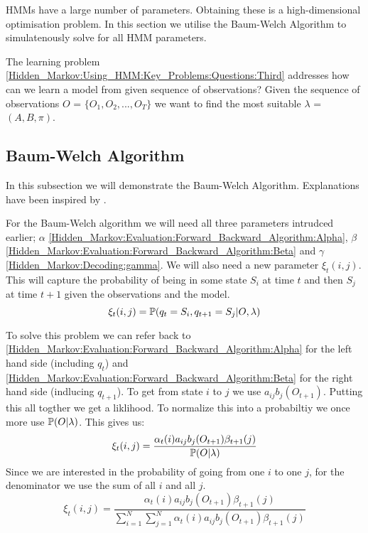 HMMs have a large number of parameters. Obtaining these is a high-dimensional optimisation problem. In this section we utilise the Baum-Welch Algorithm to simulatenously solve for all HMM parameters.

The learning problem \ref{Hidden_Markov:Using_HMM:Key_Problems:Questions:Third} addresses how can we learn a model from given sequence of observations?  Given the sequence of observations $O$ = $\{O_1,O_2,...,O_T\}$ we want to find the most suitable $\lambda$ = $(A,B,\pi)$.


    \subsection{Baum-Welch Algorithm}
    \label{Hidden_Markov:Learning:Baum_Welch}

    In this subsection we will demonstrate the Baum-Welch Algorithm. Explanations have been inspired by \cite{Baum}.

    For the Baum-Welch algorithm we will need all three parameters intrudced earlier; $\alpha$ \ref{Hidden_Markov:Evaluation:Forward_Backward_Algorithm:Alpha}, $\beta$ \ref{Hidden_Markov:Evaluation:Forward_Backward_Algorithm:Beta} and $\gamma$ \ref{Hidden_Markov:Decoding:gamma}. We will also need a new parameter $\xi_t(i,j)$. This will capture the probability of being in some state $S_i$ at time $t$ and then $S_j$ at time $t+1$ given the observations and the model. 
    \begin{equation}
        \xi_t(i,j) = \mathbb{P} (q_t = S_i, q_{t+1} = S_j | O, \lambda)
    \end{equation} 

    To solve this problem we can refer back to \ref{Hidden_Markov:Evaluation:Forward_Backward_Algorithm:Alpha} for the left hand side (including $q_t$) and \ref{Hidden_Markov:Evaluation:Forward_Backward_Algorithm:Beta} for the right hand side (indlucing $q_{t+1}$). To get from state $i$ to $j$ we use $a_{ij} b_j(O_{t+1})$. Putting this all togther we get a liklihood. To normalize this into a probabiltiy we once more use $\mathbb{P} (O|\lambda)$. This gives us:
    \begin{equation}
        \xi_t(i,j) = \dfrac{\alpha_t(i) a_{ij} b_j(O_{t+1}) \beta_{t+1}(j)}{\mathbb{P} (O|\lambda)}
    \end{equation}
    Since we are interested in the probability of going from one $i$ to one $j$, for the denominator we use the sum of all $i$ and all $j$. 
    \begin{equation}
        \xi_t(i,j) = \dfrac{\alpha_t(i) a_{ij} b_j(O_{t+1}) \beta_{t+1}(j)}{\sum_{i=1}^N \sum_{j=1}^N \alpha_t(i) a_{ij} b_j(O_{t+1}) \beta_{t+1}(j)}
    \end{equation}

